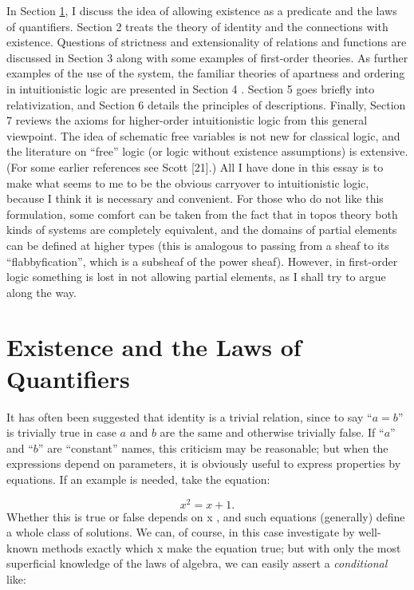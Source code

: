 In Section \ref{sec1}, I discuss the idea of allowing existence as a predicate and
the laws of quantifiers. Section 2 treats the theory of identity and the connections with existence. Questions of strictness and extensionality of relations and functions are discussed in Section 3 along with some examples of first-order theories. As further examples of the use of the system, the familiar theories of apartness and ordering in intuitionistic logic are presented in Section 4 . Section 5 goes briefly into relativization, and Section 6 details the principles of descriptions. Finally, Section 7 reviews the axioms for higher-order intuitionistic logic from this general viewpoint.
The idea of schematic free variables is not new for classical logic, and the literature on ``free'' logic (or logic without existence assumptions) is extensive.
(For some earlier references see Scott [21].) All I have done in this essay is
to make what seems to me to be the obvious carryover to intuitionistic logic,
because I think it is necessary and convenient. For those who do not like this formulation, some comfort can be taken from the fact that in topos theory both kinds of systems are completely equivalent, and the domains of partial elements can be defined at higher types (this is analogous to passing from a sheaf to its ``flabbyfication'', which is a subsheaf of the power sheaf). However, in first-order logic something is lost in not allowing partial elements, as I shall try to argue along
the way.

\section{Existence and the Laws of Quantifiers}\label{sec1}

It has often been suggested that identity is a trivial relation, since to say
``$a = b$'' is trivially true in case $a$ and $b$ are the same and otherwise trivially false. 
If ``$a$'' and ``$b$'' are ``constant'' names, this criticism may be reasonable; but when the expressions depend on parameters, it is obviously useful to express properties by equations. If an example is needed, take the equation:

$$
x^2 = x + 1.
$$
Whether this is true or false depends on x , and such equations (generally) define a whole class of solutions. We can, of course, in this case investigate by well- known methods exactly which x make the equation true; but with only the most superficial knowledge of the laws of algebra, we can easily assert a {\it conditional} like:

